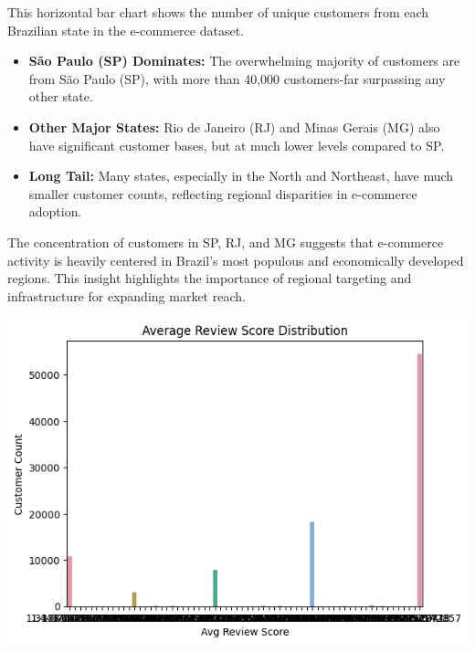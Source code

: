 \documentclass[a4paper]{article}
\begin{document}
\begin{multicols}{2}
    This horizontal bar chart shows the number of unique customers from each Brazilian state in the e-commerce dataset.

    \begin{itemize}
        \item \textbf{São Paulo (SP) Dominates:} The overwhelming majority of customers are from São Paulo (SP), with more than 40,000 customers-far surpassing any other state.
        \item \textbf{Other Major States:} Rio de Janeiro (RJ) and Minas Gerais (MG) also have significant customer bases, but at much lower levels compared to SP.
        \item \textbf{Long Tail:} Many states, especially in the North and Northeast, have much smaller customer counts, reflecting regional disparities in e-commerce adoption.
    \end{itemize}

    The concentration of customers in SP, RJ, and MG suggests that e-commerce activity is heavily centered in Brazil’s most populous and economically developed regions. This insight highlights the importance of regional targeting and infrastructure for expanding market reach.
    \label{fig:customer_state}



\noindent
\begin{minipage}{\columnwidth}
\centering
\includegraphics[width=1\textwidth]{plots/Average Review Score Distribution.png}
\label{fig:Average Review Score Distribution} 
\end{minipage}


\end{multicols}
\end{document}
